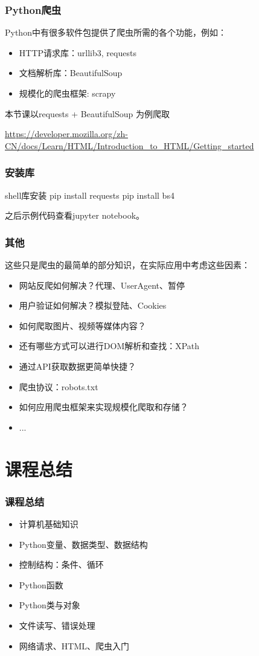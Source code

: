 \documentclass[9pt]{beamer}
\begin{document}
\begin{frame}
    \frametitle{Python爬虫}

Python中有很多软件包提供了爬虫所需的各个功能，例如：

\begin{itemize}
    \item HTTP请求库：urllib3, requests
    \item 文档解析库：BeautifulSoup
    \item 规模化的爬虫框架: scrapy
\end{itemize}

\vspace{5mm}
本节课以requests + BeautifulSoup 为例爬取

\url{https://developer.mozilla.org/zh-CN/docs/Learn/HTML/Introduction_to_HTML/Getting_started} 

\end{frame}

\begin{frame}[fragile]
\frametitle{安装库}

\begin{codebox}{shell}{库安装}
pip install requests
pip install bs4
\end{codebox}

之后示例代码查看jupyter notebook。

\end{frame}

\begin{frame}
    \frametitle{其他}

    这些只是爬虫的最简单的部分知识，在实际应用中考虑这些因素：

    \begin{itemize}
        \item 网站反爬如何解决？代理、UserAgent、暂停
        \item 用户验证如何解决？模拟登陆、Cookies
        \item 如何爬取图片、视频等媒体内容？
        \item 还有哪些方式可以进行DOM解析和查找：XPath
        \item 通过API获取数据更简单快捷？
        \item 爬虫协议：robots.txt
        \item 如何应用爬虫框架来实现规模化爬取和存储？
        \item ...
    \end{itemize}

\end{frame}


\section{课程总结}
\begin{frame}
    \frametitle{课程总结}

    \begin{itemize}
        \item 计算机基础知识
        \item Python变量、数据类型、数据结构
        \item 控制结构：条件、循环
        \item Python函数
        \item Python类与对象
        \item 文件读写、错误处理
        \item 网络请求、HTML、爬虫入门
    \end{itemize}

\end{frame}
\end{document}
